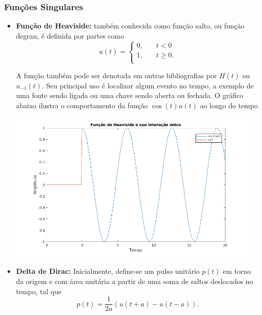 \documentclass{article}
\numberwithin{equation}{section}
\begin{document}
\subsubsection{Funções Singulares}

\begin{itemize}
    \item \textbf{Função de Heaviside:} também conhecida como função salto, ou função degrau, é definida por partes como
    $$ u(t) =
    \begin{cases}
        0, &\quad t<0 \\
        1, &\quad t\geqslant 0. \\
    \end{cases}
    $$

    A função também pode ser denotada em outras bibliografias por $H(t)$ ou $u_{-1}(t)$. Seu principal uso é localizar algum evento no tempo, a exemplo de uma fonte sendo ligada ou uma chave sendo aberta ou fechada. O gráfico abaixo ilustra o comportamento da função $\cos (t)u(t)$ ao longo do tempo

    \begin{center}
        \includegraphics[width=0.95\textwidth]{img/cos(t).png}
    \end{center}

    \item \textbf{Delta de Dirac:} Inicialmente, define-se um pulso unitário $p(t)$ em torno da origem e com área unitária a partir de uma soma de saltos deslocados no tempo, tal que
    \begin{equation}
         p(t) = \dfrac{1}{2a}(u(t+a) - u(t-a)). \label{eq:pulso}
    \end{equation}


\end{itemize}
\end{document}
